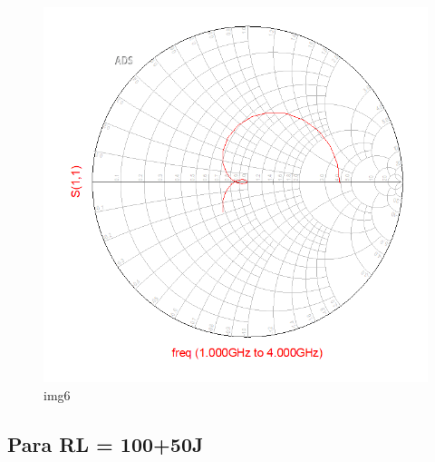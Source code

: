 \documentclass[11pt]{article}
\begin{document}
    \begin{figure}
\centering
\includegraphics{media/2.3-corrigido.png}
\caption{img6}
\end{figure}

    \hypertarget{para-rl-10050j}{%
\subsection{Para RL = 100+50J}\label{para-rl-10050j}}
\end{document}

